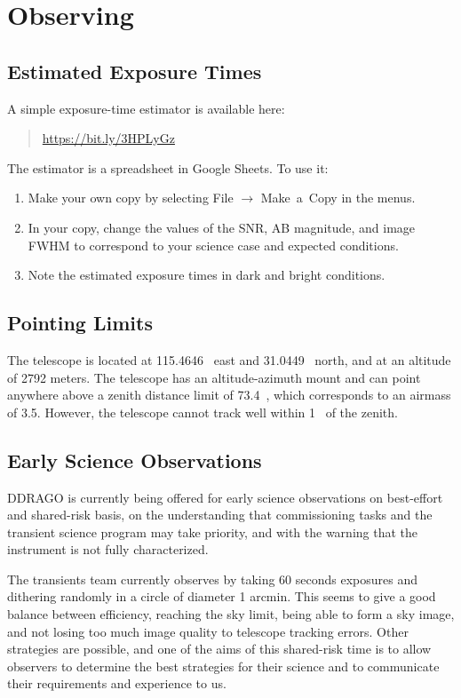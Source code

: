 \chapter{Observing}

\section{Estimated Exposure Times}

A simple exposure-time estimator is available here:

\begin{quote}
\url{https://bit.ly/3HPLyGz}
\end{quote}

The estimator is a spreadsheet in Google Sheets. To use it:
\begin{enumerate}
\item 
Make your own copy by selecting File $\rightarrow$ Make~a~Copy in the menus.
\item
In your copy, change the values of the SNR, AB magnitude, and image FWHM to correspond to your science case and expected conditions.
\item 
Note the estimated exposure times in dark and bright conditions.
\end{enumerate}

\section{Pointing Limits}

The telescope is located at 115.4646~{\deg} east and 31.0449~{\deg} north, and at an 
altitude of 2792 meters. The telescope has an altitude-azimuth mount and can point anywhere above a zenith distance limit of 73.4~{\deg}, which corresponds to an airmass of 3.5. However, the telescope cannot track well within 1~{\deg} of the zenith.

\section{Early Science Observations}

DDRAGO is currently being offered for early science observations on best-effort and shared-risk basis, on the understanding that commissioning tasks and the transient science program may take priority, and with the warning that the instrument is not fully characterized. 

The transients team currently observes by taking 60 seconds exposures and dithering randomly in a circle of diameter 1 arcmin. This seems to give a good balance between efficiency, reaching the sky limit, being able to form a sky image, and not losing too much image quality to telescope tracking errors. Other strategies are possible, and one of the aims of this shared-risk time is to allow observers to determine the best strategies for their science and to communicate their requirements and experience to us.

